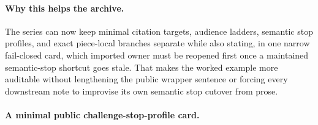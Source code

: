 \documentclass[11pt]{article}
\begin{document}
\paragraph{Why this helps the archive.}
The series can now keep minimal citation targets, audience ladders, semantic stop profiles, and exact piece-local branches separate while also stating, in one narrow fail-closed card, which imported owner must be reopened first once a maintained semantic-stop shortcut goes stale.
That makes the worked example more auditable without lengthening the public wrapper sentence or forcing every downstream note to improvise its own semantic stop cutover from prose.


\paragraph{A minimal public challenge-stop-profile card.}
\end{document}

